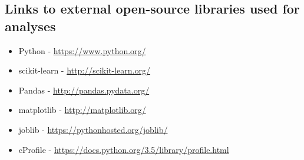 \documentclass[letterpaper,10pt]{article}
\theoremstyle{mytheor}
\begin{document}
\subsection{Links to external open-source libraries used for analyses}
\begin{itemize}
\item Python - \url{https://www.python.org/}
\item scikit-learn - \url{http://scikit-learn.org/}
\item Pandas - \url{http://pandas.pydata.org/}
\item matplotlib - \url{http://matplotlib.org/}
\item joblib - \url{https://pythonhosted.org/joblib/}
\item cProfile - \url{https://docs.python.org/3.5/library/profile.html}
\end{itemize}
\end{document}
